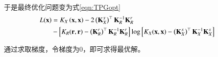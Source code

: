 于是最终优化问题变为式\ref{eqn:TPGopt}
\begin{align}
 L(\textbf{x}) &= K_X\left(\textbf{x},\textbf{x}\right)-2\left(\textbf{K}_X^x\right)^\top \textbf{K}_R^{-1} \textbf{K}_R^r \notag\\
               &- \left[K_R(\textbf{r},\textbf{r}) - \left(\textbf{K}_R^r\right)^\top \textbf{K}_R^{-1} \textbf{K}_R^r\right] \log\left[K_X(\textbf{x},\textbf{x}) - \left(\textbf{K}_X^x\right)^\top \textbf{K}_X^{-1} \textbf{K}_X^x\right] \label{eqn:TPGopt}
 \end{align}
 
通过求取梯度，令梯度为0，即可求得最优解。
    